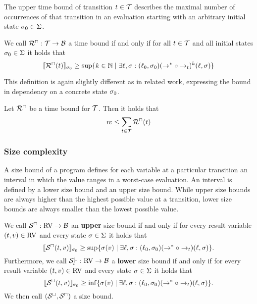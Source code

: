 The upper time bound of transition $t \in \mathcal{T}$ describes the maximal number of occurrences of that transition in an evaluation starting with an arbitrary initial state $\sigma_0 \in \Sigma$.

\begin{definition}
  We call ${\mathcal{R}^\sqcap}: \mathcal{T} \rightarrow \mathcal{B}$ a time bound if and only if for all $t \in \mathcal{T}$ and all initial states $\sigma_0 \in \Sigma$ it holds that
  \[ \llbracket {\mathcal{R}^\sqcap}(t) \rrbracket_{\sigma_0} \geq \sup \lbrace  k \in \mathbb{N} \mid \exists \ell, \sigma: (\ell_0, \sigma_0) (\rightarrow^* \circ \rightarrow_t)^k (\ell, \sigma)  \rbrace \]
\end{definition}

This definition is again slightly different as in related work, expressing the bound in dependency on a concrete state $\sigma_0$.

\begin{theorem}
	Let ${\mathcal{R}^\sqcap}$ be a time bound for $\mathcal{T}$.
	Then it holds that 
	\[ \mathit{rc} \leq \sum_{t \in \mathcal{T}}{\mathcal{R}^\sqcap}(t) \]
\end{theorem}

\subsubsection{Size complexity}

A size bound of a program defines for each variable at a particular transition an interval in which the value ranges in a worst-case evaluation.
An interval is defined by a lower size bound and an upper size bound.
While upper size bounds are always higher than the highest possible value at a transition, lower size bounds are always smaller than the lowest possible value.

\begin{definition}
  We call ${\mathcal{S}^\sqcap}: \text{RV} \rightarrow \mathcal{B}$ an \textbf{upper} size bound if and only if for every result variable $(t, v) \in \text{RV}$ and every state $\sigma \in \Sigma$ it holds that
  \[ \llbracket {\mathcal{S}^\sqcap}(t, v) \rrbracket_{\sigma_0} \geq \sup \lbrace \sigma(v) \mid \exists \ell, \sigma: (\ell_0, \sigma_0) (\rightarrow^* \circ \rightarrow_t) (\ell, \sigma) \rbrace. \]
  Furthermore, we call ${\mathcal{S}^\sqcup_l}: \text{RV} \rightarrow \mathcal{B}$ a \textbf{lower} size bound if and only if for every result variable $(t, v) \in \text{RV}$ and every state $\sigma \in \Sigma$ it holds that
  \[ \llbracket {\mathcal{S}^\sqcup}(t, v) \rrbracket_{\sigma_0} \geq \inf \lbrace \sigma(v) \mid \exists \ell, \sigma: (\ell_0, \sigma_0) (\rightarrow^* \circ \rightarrow_t) (\ell, \sigma) \rbrace. \]
  We then call ${({\mathcal{S}^\sqcup}, {\mathcal{S}^\sqcap})}$ a size bound.
\end{definition}

